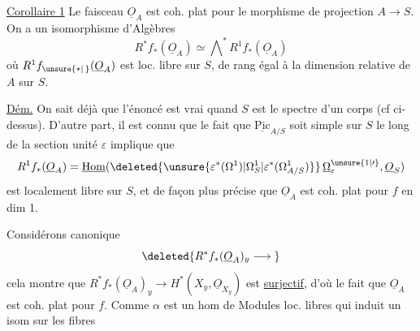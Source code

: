 \noindent\llap{\smash{\rule[-1.8\baselineskip]{0.4pt}{1.7\baselineskip}}\quad}\uline{Corollaire 1}  Le faisceau $\underline O_A$ est coh. plat pour le  morphisme de projection $A\to S$.  On a un isomorphisme d'Algèbres
\[
R^{*}f_*(\underline O_A)\simeq\bigwedge\nolimits^{*} R^{1}f_*(\underline O_A)
\]
\noindent\llap{\smash{\rule[-1.2\baselineskip]{0.4pt}{1.5\baselineskip}}\quad}où $R^1f_{\unsure{*|\,}}(\underline O_A)$ est loc. libre sur $S$, de rang égal à la dimension relative de $A$ sur $S$.

\uline{Dém.} On sait déjà que l'énoncé est vrai quand $S$ est le spectre d'un corps (cf ci-dessus).  D'autre part, il est connu que le fait que $\underline{\mathrm{Pic}}_{A/S}$ soit simple sur $S$ le long de la section unité $\varepsilon$ implique que
\[
R^1f_*(\underline O_A)=\underline{\mathrm{Hom}}(\deleted{\unsure{\varepsilon^*(\Omega^1)|\Omega^1_{S}|\varepsilon^*(\Omega^1_{A/S})}}\,\underline{\Omega}^{\unsure{1|\prime}}_\varepsilon,\underline O_S)
\]
est localement libre sur $S$, et de façon plus précise que $\underline O_A$ est coh. plat pour $f$ en dim 1.

Considérons    canonique
\[
\deleted{R^{*}f_*(\underline O_A)_y\longrightarrow{}}
\]
cela montre que $R^*f_*(\underline O_A)_y\to H^{*}(X_y,\underline O_{X_y})$ est \uline{surjectif}, d'où le fait que $\underline O_A$ est coh. plat pour $f$. Comme $\alpha$ est un hom de Modules loc. libres qui induit un isom sur les fibres

